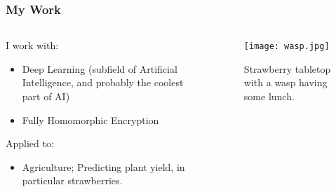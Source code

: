 \documentclass[aspectratio=169]{beamer}
\begin{document}
  \begin{frame}
    \frametitle{My Work}
    \begin{columns}
      \begin{column}{0.5\textwidth}
        I work with:
        \begin{itemize}
          \item Deep Learning (subfield of Artificial Intelligence, and probably the coolest part of AI)
          \item Fully Homomorphic Encryption
        \end{itemize}
        Applied to:
        \begin{itemize}
          \item Agriculture; Predicting plant yield, in particular strawberries.
        \end{itemize}
      \end{column}
      \begin{column}{0.5\textwidth}
        \begin{figure}[th!]
          \centering
          \texttt{[image: wasp.jpg]}
          \caption{Strawberry tabletop with a wasp having some lunch. \autocite{repository}}
          \label{fig:wasp}
        \end{figure}
      \end{column}

    \end{columns}
  \end{frame}
\end{document}
